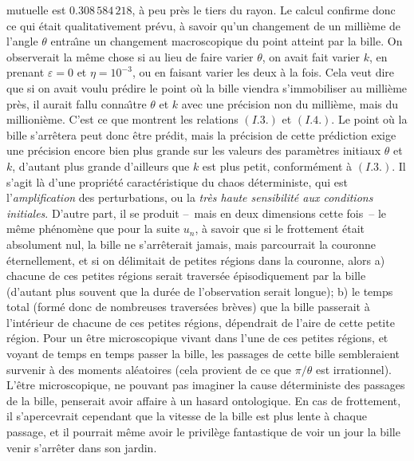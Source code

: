 mutuelle est $0.308\, 584\, 218$, \`a peu pr\`es le tiers du rayon. Le 
calcul confirme donc ce qui \'etait qualitativement pr\'evu, \`a savoir 
qu'un changement de un milli\`eme de l'angle $\theta$ entra\^\i ne un 
changement macroscopique du point atteint par la bille. On observerait la 
m\^eme chose si au lieu de faire varier $\theta$, on avait fait varier  $k$, 
en prenant $\varepsilon = 0$ et $\eta = 10^{-3}$, ou en faisant varier les 
deux \`a la fois. Cela veut dire que si on avait voulu pr\'edire le point o\`u 
la bille viendra s'immobiliser au milli\`eme pr\`es, il aurait fallu 
conna\^\i tre $\theta$ et $k$ avec une pr\'ecision non du milli\`eme, mais 
du millioni\`eme. C'est ce que montrent les relations $(I.3.)$ et $(I.4.)$. 
Le point o\`u la bille s'arr\^etera peut donc \^etre pr\'edit, mais la 
pr\'ecision de cette pr\'ediction exige une pr\'ecision encore bien plus 
grande sur les valeurs des param\`etres initiaux $\theta$ et $k$, 
d'autant plus grande d'ailleurs que $k$ est plus petit, conform\'ement \`a 
$(I.3.)$. Il s'agit l\`a d'une propri\'et\'e caract\'eristique du chaos 
d\'eterministe, qui est l'{\it amplification} des perturbations, ou la 
{\it tr\`es haute sensibilit\'e aux conditions initiales}. 
\medskip  
D'autre part, il se produit --~mais en deux dimensions cette fois~-- le 
m\^eme ph\'enom\`ene que pour la suite $u_n$, \`a savoir que si le 
frottement \'etait absolument nul, la bille ne s'arr\^eterait jamais,  mais 
parcourrait la couronne \'eternellement, et si on d\'elimitait de petites 
r\'egions dans la couronne, alors  
\smallskip 
a) chacune de ces petites r\'egions serait travers\'ee \'episodiquement  
par la bille (d'autant plus souvent que la dur\'ee de l'observation serait 
longue);  
\smallskip 
b) le temps total (form\'e donc de nombreuses travers\'ees br\`eves)  
que la bille passerait \`a l'int\'erieur de chacune de ces petites 
r\'egions, d\'ependrait de l'aire de cette petite r\'egion. 
\medskip 
Pour un \^etre microscopique vivant dans l'une de ces petites r\'egions, 
et voyant de temps en temps passer la bille, les passages de cette bille 
sembleraient survenir \`a des moments al\'eatoires (cela provient de ce 
que $\pi / \theta$ est irrationnel). L'\^etre  microscopique, ne pouvant  
pas imaginer la cause d\'eterministe des passages de la bille, penserait 
avoir affaire \`a un hasard ontologique. En cas de frottement, il 
s'apercevrait cependant que  la vitesse de la bille est plus lente \`a 
chaque passage, et il pourrait m\^eme avoir le privil\`ege fantastique de 
voir un jour la bille venir s'arr\^eter dans son jardin. 
